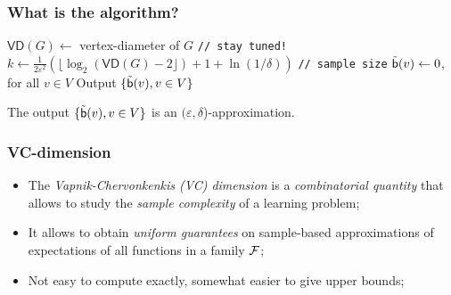 \begin{frame}
  \frametitle{What is the algorithm?}
  \begin{algorithm}[H]
    \DontPrintSemicolon
    $\mathsf{VD}(G)\leftarrow$ vertex-diameter of $G$ \texttt{// stay
    tuned!}\;
    $k\leftarrow\frac{1}{2\varepsilon^2}\left(\lfloor\log_2(\mathsf{VD}(G)-2\rfloor)
    +1 + \ln(1/\delta)\right)$ \texttt{// sample size}\;
    $\tilde{\mathsf{b}}(v)\leftarrow 0$, for all $v\in V$\;
    Output $\{\tilde{\mathsf{b}}(v), v\in V\}$
  \end{algorithm}
  \pause
  \begin{theorem}
    The output $\{\tilde{\mathsf{b}}(v), v\in V\}$ is an
    $(\varepsilon,\delta$)-approximation.
  \end{theorem}
\end{frame}

\begin{frame}
  \frametitle{VC-dimension}
  \begin{itemize}
    \item The \emph{Vapnik-Chervonkenkis (VC) dimension} is a
      \emph{combinatorial quantity} that allows to study the \emph{sample
      complexity} of a learning problem;
    \pause
    \item It allows to obtain \emph{uniform guarantees} on sample-based
      approximations of
      expectations of all functions in a family ${\cal F}$;
    \pause
    \item Not easy to compute exactly, somewhat easier to give upper bounds;
  \end{itemize}
\end{frame}

